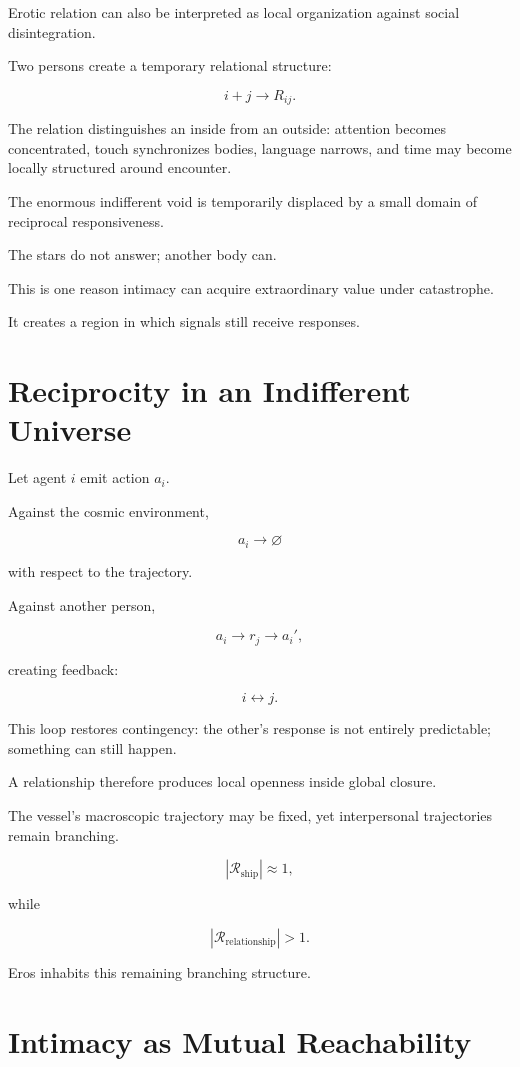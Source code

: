 \documentclass[11pt,oneside]{book}
\theoremstyle{definition}
\theoremstyle{remark}
\newcommand{\R}{\mathcal{R}}
\begin{document}
Erotic relation can also be interpreted as local organization against social disintegration.

Two persons create a temporary relational structure:

\[
i+j\rightarrow R_{ij}.
\]

The relation distinguishes an inside from an outside: attention becomes concentrated, touch synchronizes bodies, language narrows, and time may become locally structured around encounter.

The enormous indifferent void is temporarily displaced by a small domain of reciprocal responsiveness.

The stars do not answer; another body can.

This is one reason intimacy can acquire extraordinary value under catastrophe.

It creates a region in which signals still receive responses.

\section{Reciprocity in an Indifferent Universe}

Let agent \(i\) emit action \(a_i\).

Against the cosmic environment,

\[
a_i
\rightarrow
\varnothing
\]

with respect to the trajectory.

Against another person,

\[
a_i
\rightarrow
r_j
\rightarrow
a_i',
\]

creating feedback:

\[
i
\leftrightarrow
j.
\]

This loop restores contingency: the other's response is not entirely predictable; something can still happen.

A relationship therefore produces local openness inside global closure.

The vessel's macroscopic trajectory may be fixed, yet interpersonal trajectories remain branching.

\[
|\R_{\mathrm{ship}}|
\approx1,
\]

while

\[
|\R_{\mathrm{relationship}}|>1.
\]

Eros inhabits this remaining branching structure.

\section{Intimacy as Mutual Reachability}
\end{document}
